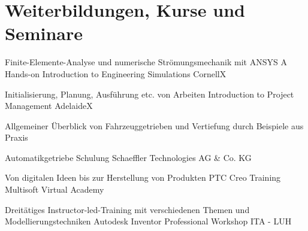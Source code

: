 \documentclass[11pt,a4paper,sans]{moderncv}
\begin{document}


\section{\textbf{Weiterbildungen, Kurse und Seminare}}

{Finite-Elemente-Analyse und numerische Strömungsmechanik mit ANSYS}
{A Hands-on Introduction to Engineering Simulations}
{CornellX}
{}
{}


{Initialisierung, Planung, Ausführung etc. von Arbeiten}
{Introduction to Project Management}
{AdelaideX}
{}
{}


{
    \parbox[t]{10cm}{Allgemeiner Überblick von Fahrzeuggetrieben und Vertiefung durch Beispiele aus Praxis}
}
{Automatikgetriebe Schulung}
{Schaeffler Technologies AG \& Co. KG}
{}
{}


{Von digitalen Ideen bis zur Herstellung von Produkten}
{PTC Creo Training}
{Multisoft Virtual Academy}
{}
{}



{Dreitätiges Instructor-led-Training mit verschiedenen Themen und Modellierungstechniken}
{Autodesk Inventor Professional Workshop}
{ITA - LUH}
{}
{}



\end{document}
